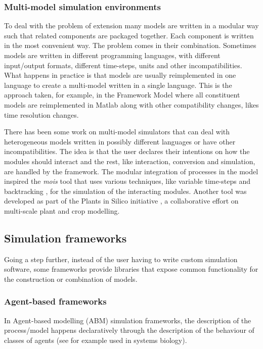\subsubsection{Multi-model simulation environments}
To deal with the problem of extension many models are written in a modular way
such that related components are packaged together. Each component is written in
the most convenient way. The problem comes in their combination. Sometimes models
are written in different programming languages, with different input/output
formats, different time-steps, units and other incompatibilities. What happens
in practice is that models are usually reimplemented in one language to create a
multi-model written in a single language. This is the approach taken, for
example, in the Framework Model where all constituent models are reimplemented
in Matlab along with other compatibility changes, likes time resolution changes.

There has been some work on multi-model simulators that can deal with
heterogeneous models written in possibly different languages or have other
incompatibilities. The idea is that the user declares their intentions on how
the modules should interact and the rest, like interaction, conversion and
simulation, are handled by the framework. The modular integration of processes
in the \citet{karr_whole-cell_2012} model inspired the \emph{mois} tool
\citep{erbm_mois_2015} that uses various techniques, like variable time-steps
and backtracking \citep{bucher2013decomposition}, for the simulation of the
interacting modules. Another tool \citep{cis_2018} was developed as part of the
Plants in Silico initiative \citep{zhu_plants_2016}, a collaborative effort on
multi-scale plant and crop modelling.

\subsection{Simulation frameworks}
\label{sec:simFrameworks}
Going a step further, instead of the user having to write custom simulation
software, some frameworks provide libraries that expose common functionality for
the construction or combination of models.

\subsubsection*{Agent-based frameworks}
In Agent-based modelling (ABM) simulation frameworks, the description of the
process/model happens declaratively through the description of the behaviour of
classes of agents (see for example \cite{solovyev_spark:_2010} used in systems
biology).

